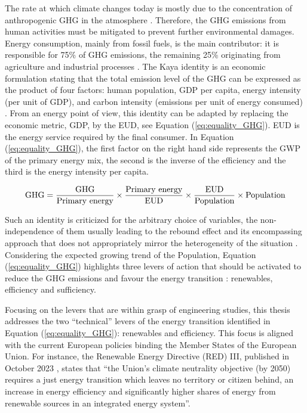 The rate at which climate changes today is mostly due to the concentration
of anthropogenic \gls{GHG} in the atmosphere \cite{IPCC_CO2_budget}. Therefore, the \gls{GHG} emissions from human activities must be mitigated to prevent further environmental damages. Energy consumption, mainly from fossil fuels, is the main contributor: it is responsible for 75\% of \gls{GHG} emissions, the remaining 25\% originating from agriculture and industrial processes \cite{ourworldindata_CO2_world}. The Kaya identity is an economic formulation stating that the total emission level of the \gls{GHG} can be expressed as the product of four factors: human population, \gls{GDP} per capita, energy intensity (per unit of GDP), and carbon intensity (emissions per unit of energy consumed) \cite{kaya1997environment}. From an energy point of view, this identity can be adapted by replacing the economic metric, \gls{GDP}, by the \gls{EUD}, see Equation (\ref{eq:equality_GHG}). \gls{EUD} is the energy service required by the final consumer. In Equation (\ref{eq:equality_GHG}), the first factor on the right hand side represents the \gls{GWP} of the primary energy mix, the second is the inverse of the efficiency and the third is the energy intensity per capita.

\begin{equation}
\label{eq:equality_GHG}
\mathrm{GHG} =  \frac{\mathrm{GHG}}{\text{Primary energy}} \times \frac{\text{Primary energy}}{\mathrm{EUD}}\times \frac{\mathrm{EUD}}{\text{Population}} \times \text{Population}\\
 \end{equation}

Such an identity is criticized for the arbitrary choice of variables, the non-independence of them usually leading to the rebound effect and its encompassing approach that does not appropriately mirror the heterogeneity of the situation \cite{IPCC2000}. Considering the expected growing trend of the Population, Equation (\ref{eq:equality_GHG}) highlights three levers of action that should be activated to reduce the \gls{GHG} emissions and favour the energy transition \cite{dodson2020population,scovronick2017impact}: renewables, efficiency and sufficiency. 

Focusing on the levers that are within grasp of engineering studies, this thesis addresses the two ``technical'' levers of the energy transition identified in Equation (\ref{eq:equality_GHG}): renewables and efficiency. This focus is aligned with the current European policies binding the Member States of the European Union. For instance, the Renewable Energy Directive (RED) III, published in October 2023 \cite{REDIII}, states that ``the Union’s climate neutrality objective (by 2050) requires a just energy transition which leaves no territory or citizen behind, an increase in energy efficiency and significantly higher shares of energy from renewable sources in an integrated energy system''.%

